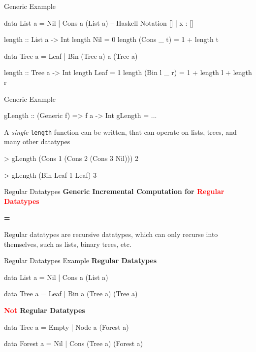 \begin{slide}{Generic Example}
\begin{haskell}
data List a = Nil | Cons a (List a) -- Haskell Notation [] | x : [] 

length :: List a -> Int
length Nil        = 0
length (Cons _ t) = 1 + length t

data Tree a = Leaf | Bin (Tree a) a (Tree a)

length :: Tree a -> Int
length Leaf        = 1
length (Bin l _ r) = 1 + length l + length r
\end{haskell}
\end{slide}

\begin{slide}{Generic Example}
\begin{chaskell}
gLength :: (Generic f) => f a -> Int
gLength = ...
\end{chaskell}

A \textit{single} \texttt{length} function can be written, that can operate on lists, trees, and many other datatypes

\vspace*{0.5cm}
\begin{haskell}
> gLength (Cons 1 (Cons 2 (Cons 3 Nil)))
    2

> gLength (Bin Leaf 1 Leaf)
    3
\end{haskell}
\end{slide}


\begin{slide}{Regular Datatypes}
\centering
\large \textbf{Generic Incremental Computation for \textcolor{red}{Regular Datatypes}}

\vspace*{.5cm}
\textbf{=}
\vspace*{.5cm}

Regular datatypes are recursive datatypes, which can only recurse into themselves, such as lists, binary trees, etc. 

\end{slide}


\begin{slide}{Regular Datatypes Example}
\textbf{Regular Datatypes}

\begin{haskell}
data List a = Nil | Cons a (List a)

data Tree a = Leaf | Bin a (Tree a) (Tree a)
\end{haskell}

\vspace*{0.5cm}
\textbf{\textcolor{red}{Not} Regular Datatypes}

\begin{haskell}
data Tree a = Empty | Node a (Forest a)

data Forest a = Nil | Cons (Tree a) (Forest a)
\end{haskell}
\end{slide}